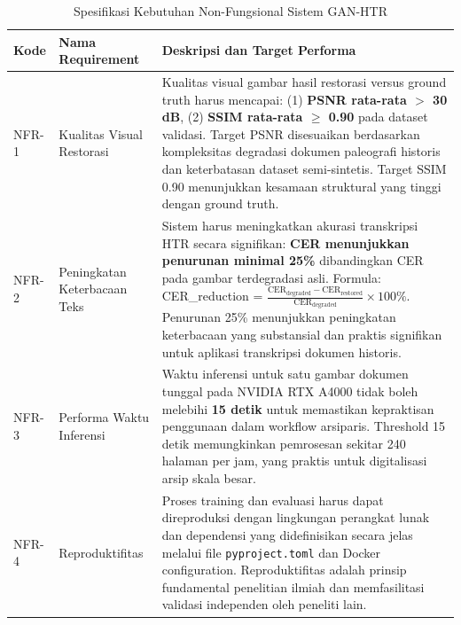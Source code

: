 \documentclass[12pt,a4paper]{book}
\begin{document}
\begin{table}[htbp!]
\centering
\small
\caption{Spesifikasi Kebutuhan Non-Fungsional Sistem GAN-HTR}
\label{tab:non_functional_requirements}
\begin{tabular}{p{}p{}p{}}
\toprule
\textbf{Kode} & \textbf{Nama Requirement} & \textbf{Deskripsi dan Target Performa} \\
\midrule
NFR-1 & Kualitas Visual Restorasi & Kualitas visual gambar hasil restorasi versus ground truth harus mencapai: (1) \textbf{PSNR rata-rata $>$ 30 dB}, (2) \textbf{SSIM rata-rata $\geq$ 0.90} pada dataset validasi. Target PSNR disesuaikan berdasarkan kompleksitas degradasi dokumen paleografi historis dan keterbatasan dataset semi-sintetis. Target SSIM 0.90 menunjukkan kesamaan struktural yang tinggi dengan ground truth. \\
\midrule
NFR-2 & Peningkatan Keterbacaan Teks & Sistem harus meningkatkan akurasi transkripsi HTR secara signifikan: \textbf{CER menunjukkan penurunan minimal 25\%} dibandingkan CER pada gambar terdegradasi asli. Formula: CER\_reduction = $\frac{\text{CER}_{\text{degraded}} - \text{CER}_{\text{restored}}}{\text{CER}_{\text{degraded}}} \times 100\%$. Penurunan 25\% menunjukkan peningkatan keterbacaan yang substansial dan praktis signifikan untuk aplikasi transkripsi dokumen historis. \\
\midrule
NFR-3 & Performa Waktu Inferensi & Waktu inferensi untuk satu gambar dokumen tunggal pada NVIDIA RTX A4000 tidak boleh melebihi \textbf{15 detik} untuk memastikan kepraktisan penggunaan dalam workflow arsiparis. Threshold 15 detik memungkinkan pemrosesan sekitar 240 halaman per jam, yang praktis untuk digitalisasi arsip skala besar. \\
\midrule
NFR-4 & Reproduktifitas & Proses training dan evaluasi harus dapat direproduksi dengan lingkungan perangkat lunak dan dependensi yang didefinisikan secara jelas melalui file \texttt{pyproject.toml} dan Docker configuration. Reproduktifitas adalah prinsip fundamental penelitian ilmiah dan memfasilitasi validasi independen oleh peneliti lain. \\
\bottomrule
\end{tabular}
\end{table}
\end{document}
